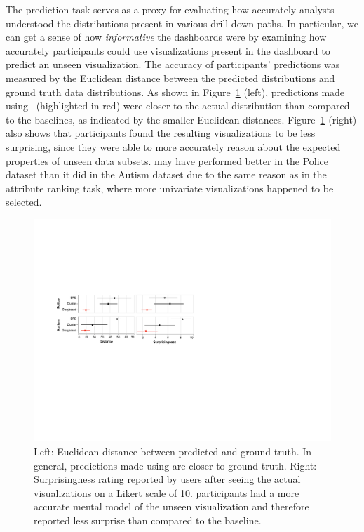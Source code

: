  The prediction task serves as a proxy for evaluating how accurately analysts understood the distributions present in various drill-down paths. In particular, we can get a sense of how \emph{informative} the dashboards were by examining how accurately participants could use visualizations present in the dashboard to predict an unseen visualization. The accuracy of participants' predictions was measured by the Euclidean distance between the predicted distributions and ground truth data distributions. As shown in Figure~\ref{fig:distance} (left), predictions made using \system\ (highlighted in red) were closer to the actual distribution than compared to the baselines, as indicated by the smaller Euclidean distances. Figure~\ref{fig:distance} (right) also shows that \system participants found the resulting visualizations to be less surprising, since they were able to more accurately reason about the expected properties of unseen data subsets. \cluster may have performed better in the Police dataset than it did in the Autism dataset due to the same reason as in the attribute ranking task, where more univariate visualizations happened to be selected.
\begin{figure}[h!]
\centering
\includegraphics[width=0.95\linewidth]{figures/prediction_surprisingness_distance.pdf}
\caption{Left: Euclidean distance between predicted and ground truth. In general, predictions made using \system are closer to ground truth. Right: Surprisingness rating reported by users after seeing the actual visualizations on a Likert scale of 10. \system participants had a more accurate mental model of the unseen visualization and therefore reported less surprise than compared to the baseline.}
\label{fig:distance}
\vspace{-10pt}
\end{figure}

